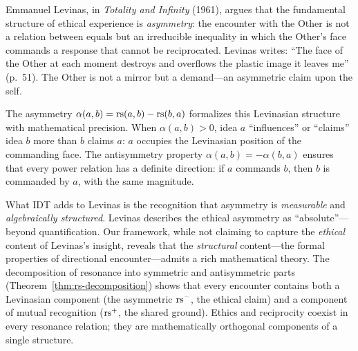 \begin{interpretation}\label{interp:ch4:levinas_ethics}
Emmanuel Levinas, in \emph{Totality and Infinity} (1961), argues that the
fundamental structure of ethical experience is \emph{asymmetry}: the
encounter with the Other is not a relation between equals but an
irreducible inequality in which the Other's face commands a response that
cannot be reciprocated. Levinas writes: ``The face of the Other at each
moment destroys and overflows the plastic image it leaves me'' (p.~51).
The Other is not a mirror but a demand---an asymmetric claim upon the self.

The asymmetry $\alpha(a, b) = \mathrm{rs}(a, b) - \mathrm{rs}(b, a)$ formalizes this
Levinasian structure with mathematical precision. When $\alpha(a, b) > 0$,
idea $a$ ``influences'' or ``claims'' idea $b$ more than $b$ claims $a$:
$a$ occupies the Levinasian position of the commanding face. The
antisymmetry property $\alpha(a, b) = -\alpha(b, a)$ ensures that every
power relation has a definite direction: if $a$ commands $b$, then $b$ is
commanded by $a$, with the same magnitude.

What IDT adds to Levinas is the recognition that asymmetry is
\emph{measurable} and \emph{algebraically structured}. Levinas describes
the ethical asymmetry as ``absolute''---beyond quantification. Our
framework, while not claiming to capture the \emph{ethical} content of
Levinas's insight, reveals that the \emph{structural} content---the
formal properties of directional encounter---admits a rich mathematical
theory. The decomposition of resonance into symmetric and antisymmetric
parts (Theorem~\ref{thm:rs-decomposition}) shows that every encounter
contains both a Levinasian component (the asymmetric $\mathrm{rs}^-$, the
ethical claim) and a component of mutual recognition ($\mathrm{rs}^+$, the
shared ground). Ethics and reciprocity coexist in every resonance
relation; they are mathematically orthogonal components of a single
structure.
\end{interpretation}

